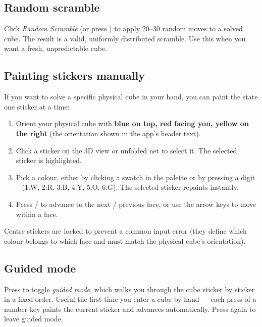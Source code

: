 \documentclass[11pt,a4paper]{article}
\newcommand{\key}[1]{\fbox{\texttt{\strut#1}}}
\begin{document}
\subsection{Random scramble}

Click \textit{Random Scramble} (or press \key{S}) to apply 20--30 random
moves to a solved cube. The result is a valid, uniformly distributed
scramble. Use this when you want a fresh, unpredictable cube.

\subsection{Painting stickers manually}

If you want to solve a specific physical cube in your hand, you can
paint the state one sticker at a time:

\begin{enumerate}[leftmargin=2em]
  \item Orient your physical cube with \textbf{blue on top, red facing you, yellow on the right}
        (the orientation shown in the app's header text).
  \item Click a sticker on the 3D view or unfolded net to select it. The
        selected sticker is highlighted.
  \item Pick a colour, either by clicking a swatch in the palette or by
        pressing a digit \key{1}--\key{6} (1:W, 2:R, 3:B, 4:Y, 5:O, 6:G).
        The selected sticker repaints instantly.
  \item Press \key{Tab} / \key{Shift+Tab} to advance to the next /
        previous face, or use the arrow keys to move within a face.
\end{enumerate}

Centre stickers are locked to prevent a common input error (they define
which colour belongs to which face and must match the physical cube's
orientation).

\subsection{Guided mode}

Press \key{G} to toggle \textit{guided mode}, which walks you through
the cube sticker by sticker in a fixed order. Useful the first time you
enter a cube by hand --- each press of a number key paints the current
sticker and advances automatically. Press \key{G} again to leave guided
mode.

\end{document}

